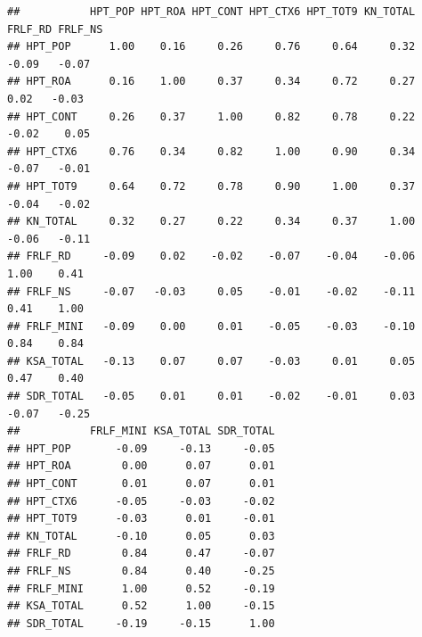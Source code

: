 \documentclass[
  10pt,
]{article}
\newenvironment{Shaded}{\begin{snugshade}}{\end{snugshade}}
\newcommand{\AttributeTok}[1]{\textcolor[rgb]{0.13,0.29,0.53}{#1}}
\newcommand{\ConstantTok}[1]{\textcolor[rgb]{0.56,0.35,0.01}{#1}}
\newcommand{\DecValTok}[1]{\textcolor[rgb]{0.00,0.00,0.81}{#1}}
\newcommand{\FunctionTok}[1]{\textcolor[rgb]{0.13,0.29,0.53}{\textbf{#1}}}
\newcommand{\NormalTok}[1]{#1}
\newcommand{\OtherTok}[1]{\textcolor[rgb]{0.56,0.35,0.01}{#1}}
\newcommand{\SpecialCharTok}[1]{\textcolor[rgb]{0.81,0.36,0.00}{\textbf{#1}}}
\newcommand{\StringTok}[1]{\textcolor[rgb]{0.31,0.60,0.02}{#1}}
\begin{document}
\begin{verbatim}
##           HPT_POP HPT_ROA HPT_CONT HPT_CTX6 HPT_TOT9 KN_TOTAL FRLF_RD FRLF_NS
## HPT_POP      1.00    0.16     0.26     0.76     0.64     0.32   -0.09   -0.07
## HPT_ROA      0.16    1.00     0.37     0.34     0.72     0.27    0.02   -0.03
## HPT_CONT     0.26    0.37     1.00     0.82     0.78     0.22   -0.02    0.05
## HPT_CTX6     0.76    0.34     0.82     1.00     0.90     0.34   -0.07   -0.01
## HPT_TOT9     0.64    0.72     0.78     0.90     1.00     0.37   -0.04   -0.02
## KN_TOTAL     0.32    0.27     0.22     0.34     0.37     1.00   -0.06   -0.11
## FRLF_RD     -0.09    0.02    -0.02    -0.07    -0.04    -0.06    1.00    0.41
## FRLF_NS     -0.07   -0.03     0.05    -0.01    -0.02    -0.11    0.41    1.00
## FRLF_MINI   -0.09    0.00     0.01    -0.05    -0.03    -0.10    0.84    0.84
## KSA_TOTAL   -0.13    0.07     0.07    -0.03     0.01     0.05    0.47    0.40
## SDR_TOTAL   -0.05    0.01     0.01    -0.02    -0.01     0.03   -0.07   -0.25
##           FRLF_MINI KSA_TOTAL SDR_TOTAL
## HPT_POP       -0.09     -0.13     -0.05
## HPT_ROA        0.00      0.07      0.01
## HPT_CONT       0.01      0.07      0.01
## HPT_CTX6      -0.05     -0.03     -0.02
## HPT_TOT9      -0.03      0.01     -0.01
## KN_TOTAL      -0.10      0.05      0.03
## FRLF_RD        0.84      0.47     -0.07
## FRLF_NS        0.84      0.40     -0.25
## FRLF_MINI      1.00      0.52     -0.19
## KSA_TOTAL      0.52      1.00     -0.15
## SDR_TOTAL     -0.19     -0.15      1.00
\end{verbatim}

\begin{Shaded}
\end{Shaded}
\end{document}
